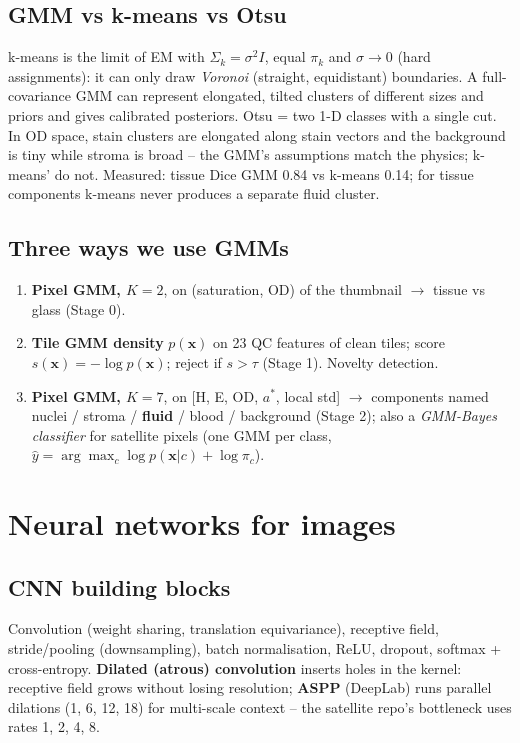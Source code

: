 \subsection{GMM vs k-means vs Otsu}
k-means is the limit of EM with $\Sigma_k=\sigma^2 I$, equal $\pi_k$ and $\sigma\to0$ (hard assignments): it can only draw
\emph{Voronoi} (straight, equidistant) boundaries. A full-covariance GMM can represent elongated, tilted clusters of
different sizes and priors and gives calibrated posteriors. Otsu = two 1-D classes with a single cut. In OD space,
stain clusters are elongated along stain vectors and the background is tiny while stroma is broad -- the GMM's
assumptions match the physics; k-means' do not. Measured: tissue Dice GMM 0.84 vs k-means 0.14; for tissue components
k-means never produces a separate fluid cluster.

\subsection{Three ways we use GMMs}
\begin{enumerate}
\item \textbf{Pixel GMM, $K=2$}, on (saturation, OD) of the thumbnail $\to$ tissue vs glass (Stage 0).
\item \textbf{Tile GMM density} $p(\mathbf{x})$ on 23 QC features of clean tiles; score $s(\mathbf{x})=-\log p(\mathbf{x})$;
reject if $s>\tau$ (Stage 1). Novelty detection.
\item \textbf{Pixel GMM, $K=7$}, on [H, E, OD, $a^*$, local std] $\to$ components named nuclei / stroma / \textbf{fluid}
/ blood / background (Stage 2); also a \emph{GMM-Bayes classifier} for satellite pixels (one GMM per class,
$\hat y=\arg\max_c \log p(\mathbf{x}|c)+\log\pi_c$).
\end{enumerate}

\section{Neural networks for images}
\subsection{CNN building blocks}
Convolution (weight sharing, translation equivariance), receptive field, stride/pooling (downsampling), batch
normalisation, ReLU, dropout, softmax + cross-entropy. \textbf{Dilated (atrous) convolution} inserts holes in the
kernel: receptive field grows without losing resolution; \textbf{ASPP} (DeepLab) runs parallel dilations (1, 6, 12, 18)
for multi-scale context -- the satellite repo's bottleneck uses rates 1, 2, 4, 8.

